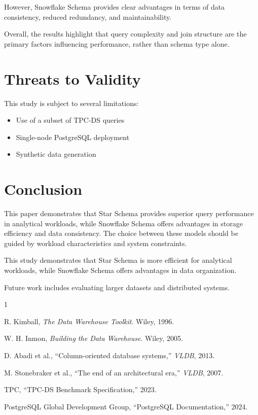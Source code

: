 \documentclass[conference]{IEEEtran}
\begin{document}
However, Snowflake Schema provides clear advantages in terms of data consistency, reduced redundancy, and maintainability.

Overall, the results highlight that query complexity and join structure are the primary factors influencing performance, rather than schema type alone.

\section{Threats to Validity}

This study is subject to several limitations:
\begin{itemize}
\item Use of a subset of TPC-DS queries
\item Single-node PostgreSQL deployment
\item Synthetic data generation
\end{itemize}

\section{Conclusion}

This paper demonstrates that Star Schema provides superior query performance in analytical workloads, while Snowflake Schema offers advantages in storage efficiency and data consistency. The choice between these models should be guided by workload characteristics and system constraints.

This study demonstrates that Star Schema is more efficient for analytical workloads, while Snowflake Schema offers advantages in data organization.

Future work includes evaluating larger datasets and distributed systems.

\begin{thebibliography}{1}

R. Kimball, \textit{The Data Warehouse Toolkit}. Wiley, 1996.

W. H. Inmon, \textit{Building the Data Warehouse}. Wiley, 2005.

D. Abadi et al., “Column-oriented database systems,” \textit{VLDB}, 2013.

M. Stonebraker et al., “The end of an architectural era,” \textit{VLDB}, 2007.

TPC, “TPC-DS Benchmark Specification,” 2023.

PostgreSQL Global Development Group, “PostgreSQL Documentation,” 2024.

\end{thebibliography}
\end{document}
